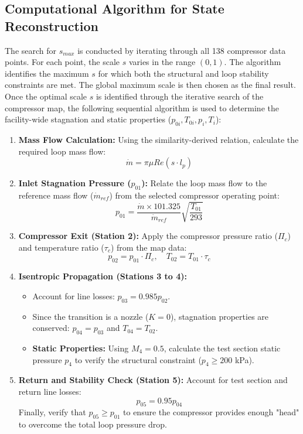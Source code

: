 \documentclass[12pt]{article}
\begin{document}
\subsection{Computational Algorithm for State Reconstruction}
The search for $s_{max}$ is conducted by iterating through all 138 compressor data points. For each point, the scale $s$ varies in the range $(0, 1)$. The algorithm identifies the maximum $s$ for which both the structural and loop stability constraints are met. The global maximum scale is then chosen as the final result.
\\

Once the optimal scale $s$ is identified through the iterative search of the compressor map, the following sequential algorithm is used to determine the facility-wide stagnation and static properties ($p_{0i}, T_{0i}, p_i, T_i$):

\begin{enumerate}
    \item \textbf{Mass Flow Calculation:} Using the similarity-derived relation, calculate the required loop mass flow:
    \[ \dot{m} = \pi \mu Re (s \cdot l_p) \]

    \item \textbf{Inlet Stagnation Pressure ($p_{01}$):} Relate the loop mass flow to the reference mass flow ($\dot{m}_{ref}$) from the selected compressor operating point:
    \[ p_{01} = \frac{\dot{m} \times 101.325}{\dot{m}_{ref}} \sqrt{\frac{T_{01}}{293}} \]

    \item \textbf{Compressor Exit (Station 2):} Apply the compressor pressure ratio ($\Pi_c$) and temperature ratio ($\tau_c$) from the map data:
    \[ p_{02} = p_{01} \cdot \Pi_c, \quad T_{02} = T_{01} \cdot \tau_c \]

    \item \textbf{Isentropic Propagation (Stations 3 to 4):} 
    \begin{itemize}
        \item Account for line losses: $p_{03} = 0.985 p_{02}$.
        \item Since the transition is a nozzle ($K=0$), stagnation properties are conserved: $p_{04} = p_{03}$ and $T_{04} = T_{02}$.
        \item \textbf{Static Properties:} Using $M_4 = 0.5$, calculate the test section static pressure $p_4$ to verify the structural constraint ($p_4 \geq 200$ kPa).
    \end{itemize}

    \item \textbf{Return and Stability Check (Station 5):} 
    Account for test section and return line losses:
    \[ p_{05} = 0.95 p_{04} \]
    Finally, verify that $p_{05} \geq p_{01}$ to ensure the compressor provides enough "head" to overcome the total loop pressure drop.
\end{enumerate}
\end{document}
